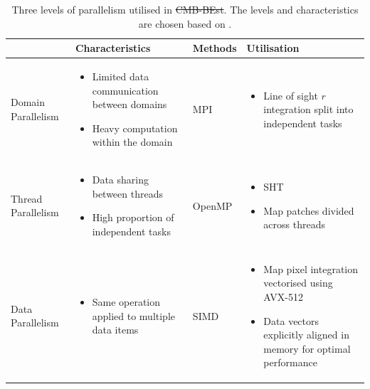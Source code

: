 \documentclass[a4paper,12pt,times,custombib,print,index]{Classes/PhDThesisPSnPDF} %
\providecommand{\DIFadd}[1]{{\protect\color{blue}\uwave{#1}}} %
\providecommand{\DIFdel}[1]{{\protect\color{red}\sout{#1}}}                      %
\providecommand{\DIFaddFL}[1]{\DIFadd{#1}} %
\providecommand{\DIFdelFL}[1]{\DIFdel{#1}} %
\providecommand{\DIFaddbeginFL}{} %
\providecommand{\DIFaddendFL}{} %
\providecommand{\DIFdelbeginFL}{} %
\providecommand{\DIFdelendFL}{} %
\newcommand{\DIFscaledelfig}{0.5}
\newlength{\DIFdelgraphicswidth} %
\newlength{\DIFdelgraphicsheight} %
\newcommand{\DIFaddincludegraphics}[2][]{{\color{blue}\fbox{\DIFOincludegraphics[#1]{#2}}}} %
\newcommand{\DIFdelincludegraphics}[2][]{%
\sbox{\DIFdelgraphicsbox}{\DIFOincludegraphics[#1]{#2}}%
\settoboxwidth{\DIFdelgraphicswidth}{\DIFdelgraphicsbox} %
\settoboxtotalheight{\DIFdelgraphicsheight}{\DIFdelgraphicsbox} %
\scalebox{\DIFscaledelfig}{%
\parbox[b]{\DIFdelgraphicswidth}{\usebox{\DIFdelgraphicsbox}\\[-\baselineskip] \rule{\DIFdelgraphicswidth}{0em}}\llap{\resizebox{\DIFdelgraphicswidth}{\DIFdelgraphicsheight}{%
\setlength{\unitlength}{\DIFdelgraphicswidth}%
\begin{picture}(1,1)%
\thicklines\linethickness{2pt} %
{\color[rgb]{1,0,0}\put(0,0){\framebox(1,1){}}}%
{\color[rgb]{1,0,0}\put(0,0){\line( 1,1){1}}}%
{\color[rgb]{1,0,0}\put(0,1){\line(1,-1){1}}}%
\end{picture}%
}\hspace*{3pt}}} %
} %
\DeclareRobustCommand{\DIFaddbeginFL}{\DIFOaddbeginFL \let\includegraphics\DIFaddincludegraphics} %
\DeclareRobustCommand{\DIFaddendFL}{\DIFOaddendFL \let\includegraphics\DIFOincludegraphics} %
\DeclareRobustCommand{\DIFdelbeginFL}{\DIFOdelbeginFL \let\includegraphics\DIFdelincludegraphics} %
\DeclareRobustCommand{\DIFdelendFL}{\DIFOaddendFL \let\includegraphics\DIFOincludegraphics} %
\begin{document}
\begin{table}[h]
	\caption{Three levels of parallelism utilised in \DIFdelbeginFL \DIFdelFL{CMB-BEst}\DIFdelendFL \DIFaddbeginFL \textsc{\DIFaddFL{CMB-BEst}}\DIFaddendFL . The levels and characteristics are chosen based on \cite{Jeffers2016intel}.}
	\centering
	\label{table:three_levels_of_parallelism}
	\renewcommand{\arraystretch}{1.5} 
	\begin{tabular}{m{}   m{}   m{}   m{}} \toprule
		 & Characteristics & Methods & Utilisation \\

		\midrule
		Domain \newline Parallelism &
		\begin{itemize}[leftmargin=*]
			\item Limited data communication between domains
			\item Heavy computation within the domain
		\end{itemize} &
		MPI &
		\begin{itemize}[leftmargin=*]
			\item Line of sight $r$ integration split into independent tasks
		\end{itemize}  \\

		\midrule
		Thread \newline Parallelism &
		\begin{itemize}[leftmargin=*]
			\item Data sharing between threads
			\item High proportion of independent tasks
		\end{itemize} &
		OpenMP &
		\begin{itemize}[leftmargin=*]
			\item SHT
			\item Map patches divided across threads
		\end{itemize}  \\	

		\midrule
		Data \newline Parallelism &
		\begin{itemize}[leftmargin=*]
			\item Same operation applied to multiple data items
		\end{itemize} &
		SIMD &
		\begin{itemize}[leftmargin=*]
			\item Map pixel integration vectorised using AVX-512
			\item Data vectors explicitly aligned in memory for optimal performance 
		\end{itemize} \\	

		\bottomrule
	\end{tabular}
\end{table}
\end{document}
